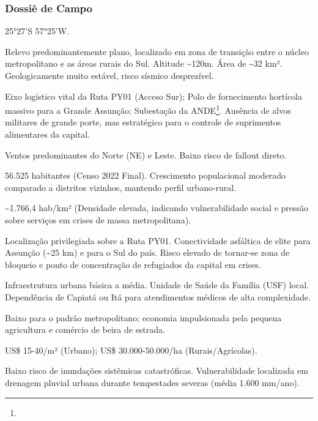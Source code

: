 \subsubsection{Dossiê de Campo}
\begin{description}[style=nextline,leftmargin=0.5cm,font=\bfseries]
\item[Coordenadas]  25°27'S 57°25'W.
\item[Topografia]  Relevo predominantemente plano, localizado em zona de transição entre o núcleo metropolitano e as áreas rurais do Sul. Altitude \textasciitilde 120m. Área de \textasciitilde 32 km². Geologicamente muito estável, risco sísmico desprezível.
\item[Alvos Estratégicos]  Eixo logístico vital da Ruta PY01 (Acceso Sur); Polo de fornecimento hortícola massivo para a Grande Assunção; Subestação da ANDE\footnote{\fineANDE}. Ausência de alvos militares de grande porte, mas estratégico para o controle de suprimentos alimentares da capital.
\item[Fallout]  Ventos predominantes do Norte (NE) e Leste. Baixo risco de fallout direto.
\item[População]  56.525 habitantes (Censo 2022 Final). Crescimento populacional moderado comparado a distritos vizinhos, mantendo perfil urbano-rural.
\item[Densidade]  \textasciitilde 1.766,4 hab/\allowbreak km² (Densidade elevada, indicando vulnerabilidade social e pressão sobre serviços em crises de massa metropolitana).
\item[Vias de Acesso]  Localização privilegiada sobre a Ruta PY01. Conectividade asfáltica de elite para Assunção (\textasciitilde 25 km) e para o Sul do país. Risco elevado de tornar-se zona de bloqueio e ponto de concentração de refugiados da capital em crises.
\item[Serviços]  Infraestrutura urbana básica a média. Unidade de Saúde da Família (USF) local. Dependência de Capiatá ou Itá para atendimentos médicos de alta complexidade.
\item[Custo de Vida]  Baixo para o padrão metropolitano; economia impulsionada pela pequena agricultura e comércio de beira de estrada.
\item[Preço da Terra]  US\$ 15-40/\allowbreak m² (Urbano); US\$ 30.000-50.000/\allowbreak ha (Rurais/\allowbreak Agrícolas).
\item[Hidrologia]  Baixo risco de inundações sistêmicas catastróficas. Vulnerabilidade localizada em drenagem pluvial urbana durante tempestades severas (média 1.600 mm/\allowbreak ano).

\end{description}
